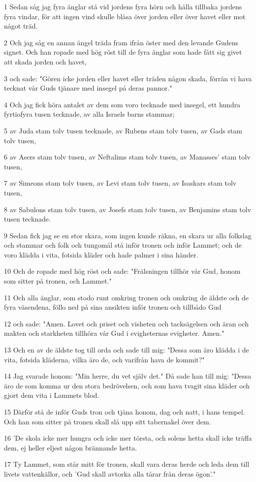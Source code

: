 \par 1 Sedan såg jag fyra änglar stå vid jordens fyra hörn och hålla tillbaka jordens fyra vindar, för att ingen vind skulle blåsa över jorden eller över havet eller mot något träd.
\par 2 Och jag såg en annan ängel träda fram ifrån öster med den levande Gudens signet. Och han ropade med hög röst till de fyra änglar som hade fått sig givet att skada jorden och havet,
\par 3 och sade: "Gören icke jorden eller havet eller träden någon skada, förrän vi hava tecknat vår Guds tjänare med insegel på deras pannor."
\par 4 Och jag fick höra antalet av dem som voro tecknade med insegel, ett hundra fyrtiofyra tusen tecknade, av alla Israels barns stammar;
\par 5 av Juda stam tolv tusen tecknade, av Rubens stam tolv tusen, av Gads stam tolv tusen,
\par 6 av Asers stam tolv tusen, av Neftalims stam tolv tusen, av Manasses' stam tolv tusen,
\par 7 av Simeons stam tolv tusen, av Levi stam tolv tusen, av Isaskars stam tolv tusen,
\par 8 av Sabulons stam tolv tusen, av Josefs stam tolv tusen, av Benjamins stam tolv tusen tecknade.
\par 9 Sedan fick jag se en stor skara, som ingen kunde räkna, en skara ur alla folkslag och stammar och folk och tungomål stå inför tronen och inför Lammet; och de voro klädda i vita, fotsida kläder och hade palmer i sina händer.
\par 10 Och de ropade med hög röst och sade: "Frälsningen tillhör vår Gud, honom som sitter på tronen, och Lammet."
\par 11 Och alla änglar, som stodo runt omkring tronen och omkring de äldste och de fyra väsendena, föllo ned på sina ansikten inför tronen och tillbådo Gud
\par 12 och sade: "Amen. Lovet och priset och visheten och tacksägelsen och äran och makten och starkheten tillhöra vår Gud i evigheternas evigheter. Amen."
\par 13 Och en av de äldste tog till orda och sade till mig: "Dessa som äro klädda i de vita, fotsida kläderna, vilka äro de, och varifrån hava de kommit?"
\par 14 Jag svarade honom: "Min herre, du vet själv det." Då sade han till mig: "Dessa äro de som komma ur den stora bedrövelsen, och som hava tvagit sina kläder och gjort dem vita i Lammets blod.
\par 15 Därför stå de inför Guds tron och tjäna honom, dag och natt, i hans tempel. Och han som sitter på tronen skall slå upp sitt tabernakel över dem.
\par 16 'De skola icke mer hungra och icke mer törsta, och solens hetta skall icke träffa dem, ej heller eljest någon brännande hetta.
\par 17 Ty Lammet, som står mitt för tronen, skall vara deras herde och leda dem till livets vattenkällor, och 'Gud skall avtorka alla tårar från deras ögon'."

